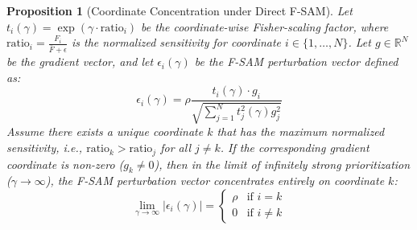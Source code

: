 \documentclass{article}
\theoremstyle{plain}
\newtheorem{proposition}[theorem]{Proposition}
\theoremstyle{definition}
\theoremstyle{remark}
\begin{document}
\begin{proposition}[Coordinate Concentration under Direct F-SAM]
Let $t_i(\gamma) = \exp(\gamma \cdot \text{ratio}_i)$ be the coordinate-wise Fisher-scaling factor, where $\text{ratio}_i = \frac{F_i}{\bar{F} + \epsilon}$ is the normalized sensitivity for coordinate $i \in \{1, \dots, N\}$. Let $g \in \mathbb{R}^N$ be the gradient vector, and let $\epsilon_i(\gamma)$ be the F-SAM perturbation vector defined as:
\begin{equation}
    \epsilon_i(\gamma) = \rho \frac{t_i(\gamma) \cdot g_i}{\sqrt{\sum_{j=1}^N t_j^2(\gamma) g_j^2}}
\end{equation}
Assume there exists a unique coordinate $k$ that has the maximum normalized sensitivity, i.e., $\text{ratio}_k > \text{ratio}_j$ for all $j \neq k$. If the corresponding gradient coordinate is non-zero ($g_k \neq 0$), then in the limit of infinitely strong prioritization ($\gamma \to \infty$), the F-SAM perturbation vector concentrates entirely on coordinate $k$:
\begin{equation}
    \lim_{\gamma \to \infty} |\epsilon_i(\gamma)| = \begin{cases} \rho & \text{if } i = k \\ 0 & \text{if } i \neq k \end{cases}
\end{equation}
\label{prop:concentration}
\end{proposition}
\end{document}
